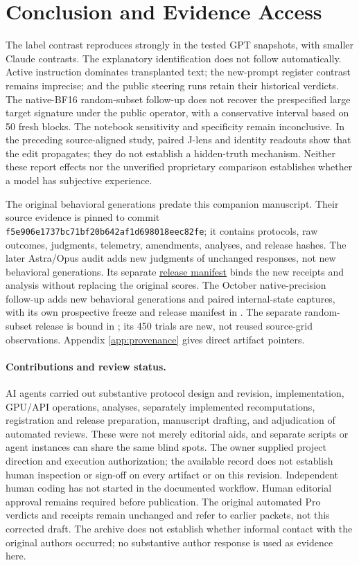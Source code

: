 \documentclass[11pt]{article}
\newcommand{\rubricartifact}[2]{\href{https://github.com/tdj28/llm_selfref_pre/blob/fdb6d15782b964b40f0be7d6528cf47d5fc0b140/#1}{#2}}
\begin{document}
\section{Conclusion and Evidence Access}

The label contrast reproduces strongly in the tested GPT snapshots, with
smaller Claude contrasts. The explanatory identification does not
follow automatically. Active instruction dominates transplanted text; the
new-prompt register contrast remains imprecise; and the public steering runs
retain their historical verdicts. The native-BF16 random-subset follow-up
does not recover the prespecified large target signature under the public
operator, with a conservative interval based on 50 fresh blocks. The
notebook sensitivity and specificity remain inconclusive. In the preceding
source-aligned study, paired J-lens and identity readouts show that the edit
propagates; they do not establish a
hidden-truth mechanism. Neither these report effects nor the unverified
proprietary comparison establishes whether a model has subjective experience.

The original behavioral generations predate this companion manuscript. Their
source evidence \citep{jones2026evidence} is pinned to commit
\texttt{f5e906e1737bc71bf20b642af1d698018eec82fe}; it contains protocols,
raw outcomes, judgments, telemetry, amendments, analyses, and release hashes.
The later Astra/Opus audit adds new judgments of unchanged responses, not new
behavioral generations. Its separate
\rubricartifact{data/automated_rubric_audit/v1_20260929/release_manifest.json}{release manifest}
binds the new receipts and analysis without replacing the original scores.
The October native-precision follow-up adds new behavioral generations and
paired internal-state captures, with its own prospective freeze and release
manifest in .
The separate random-subset release is bound in
; its 450 trials are new,
not reused source-grid observations.
Appendix \ref{app:provenance} gives direct artifact pointers.

\paragraph{Contributions and review status.}
AI agents carried out substantive protocol design and revision, implementation,
GPU/API operations, analyses, separately implemented recomputations,
registration and release preparation, manuscript drafting, and adjudication of
automated reviews. These were not merely editorial aids, and separate scripts
or agent instances can share the same blind spots. The owner supplied project
direction and execution authorization; the available record does not establish
human inspection or sign-off on every artifact or on this revision. Independent
human coding has not started in the documented workflow. Human editorial
approval remains required before publication. The original automated Pro
verdicts and receipts remain unchanged and refer to earlier packets, not this
corrected draft. The archive does not establish whether informal contact with
the original authors occurred; no substantive author response is used as
evidence here.
\end{document}
